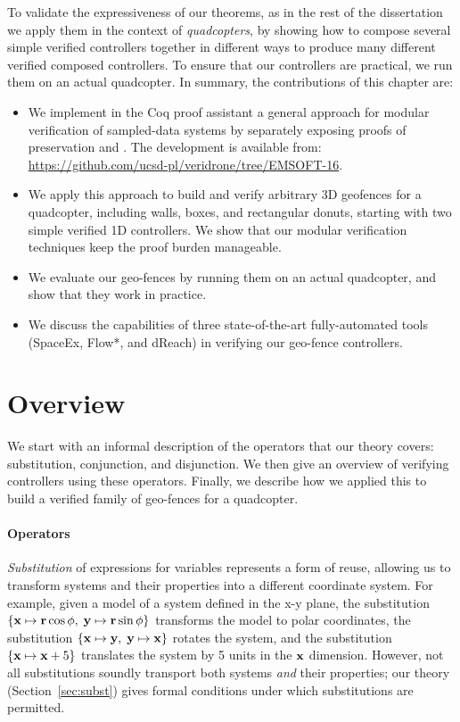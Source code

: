 To validate the expressiveness of our theorems, as in the rest of the
dissertation we apply them in the context of \emph{quadcopters}, by showing
how to compose several simple verified controllers together in different
ways to produce many different verified composed controllers.  To ensure
that our controllers are practical, we run them on an actual quadcopter.
In summary, the contributions of this chapter are:
\begin{itemize}
\setlength\itemsep{0.01em}
\item We implement in the Coq proof assistant a general approach for modular verification of sampled-data systems by separately exposing proofs of preservation and \progress{}. The development is available from: \url{https://github.com/ucsd-pl/veridrone/tree/EMSOFT-16}.
\item We apply this approach to build and verify arbitrary 3D geofences for a quadcopter, including walls, boxes, and rectangular donuts, starting with two simple verified 1D controllers.
We show that our modular verification techniques keep the proof burden manageable.
\item We evaluate our geo-fences by running them on an actual quadcopter, and show that they work in practice.
\item We discuss the capabilities of three state-of-the-art fully-automated tools (SpaceEx, Flow*, and dReach) in verifying our geo-fence controllers.
\end{itemize}

\section{Overview}
We start with an informal description of the operators that our theory
covers: substitution, conjunction, and disjunction.  We then give an
overview of verifying controllers using these operators.  Finally, we
describe how we applied this to build a verified family of geo-fences for a
quadcopter.

\paragraph*{Operators}
\emph{Substitution} of expressions for variables represents a form of
reuse, allowing us to transform systems and their properties into a
different coordinate system.  For example, given a model of a system
defined in the x-y plane, the substitution $\{\mathbf{x} \mapsto \mathbf{r}
\cos \mathbf{\phi},\; \mathbf{y} \mapsto \mathbf{r} \sin \mathbf{\phi}\}$
transforms the model to polar coordinates, the substitution $\{\mathbf{x}
\mapsto \mathbf{y},\; \mathbf{y} \mapsto \mathbf{x}\}$ rotates the system,
and the substitution $\{\mathbf{x} \mapsto \mathbf{x} + 5\}$ translates the
system by 5 units in the $\mathbf{x}$ dimension.  However, not all
substitutions soundly transport both systems \emph{and} their properties;
our theory (Section~\ref{sec:subst}) gives formal conditions under which
substitutions are permitted.

